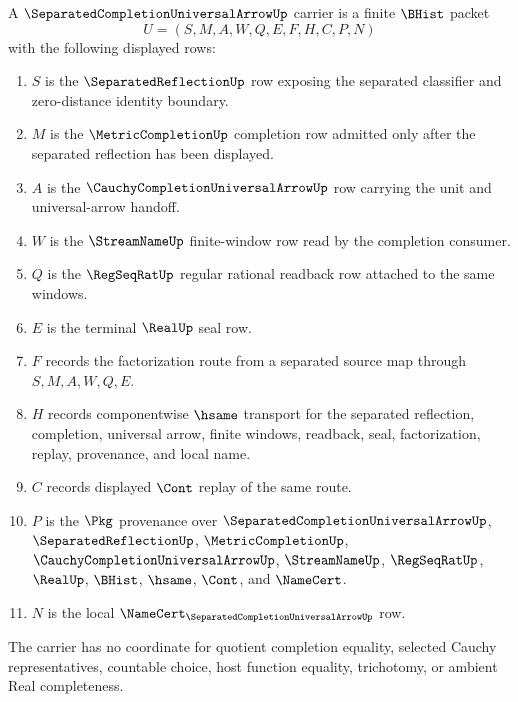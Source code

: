 \begin{definition}
\label{def:separated-completion-universal-arrow-carrier}
A $\SeparatedCompletionUniversalArrowUp$ carrier is a finite $\BHist$ packet
$$
U=(S,M,A,W,Q,E,F,H,C,P,N)
$$
with the following displayed rows:
\begin{enumerate}
\item $S$ is the $\SeparatedReflectionUp$ row exposing the separated classifier and zero-distance identity boundary.
\item $M$ is the $\MetricCompletionUp$ completion row admitted only after the separated reflection has been displayed.
\item $A$ is the $\CauchyCompletionUniversalArrowUp$ row carrying the unit and universal-arrow handoff.
\item $W$ is the $\StreamNameUp$ finite-window row read by the completion consumer.
\item $Q$ is the $\RegSeqRatUp$ regular rational readback row attached to the same windows.
\item $E$ is the terminal $\RealUp$ seal row.
\item $F$ records the factorization route from a separated source map through $S,M,A,W,Q,E$.
\item $H$ records componentwise $\hsame$ transport for the separated reflection, completion, universal arrow, finite windows, readback, seal, factorization, replay, provenance, and local name.
\item $C$ records displayed $\Cont$ replay of the same route.
\item $P$ is the $\Pkg$ provenance over $\SeparatedCompletionUniversalArrowUp$, $\SeparatedReflectionUp$, $\MetricCompletionUp$, $\CauchyCompletionUniversalArrowUp$, $\StreamNameUp$, $\RegSeqRatUp$, $\RealUp$, $\BHist$, $\hsame$, $\Cont$, and $\NameCert$.
\item $N$ is the local $\NameCert_{\SeparatedCompletionUniversalArrowUp}$ row.
\end{enumerate}
The carrier has no coordinate for quotient completion equality, selected Cauchy representatives, countable choice, host function equality, trichotomy, or ambient Real completeness.
\end{definition}


